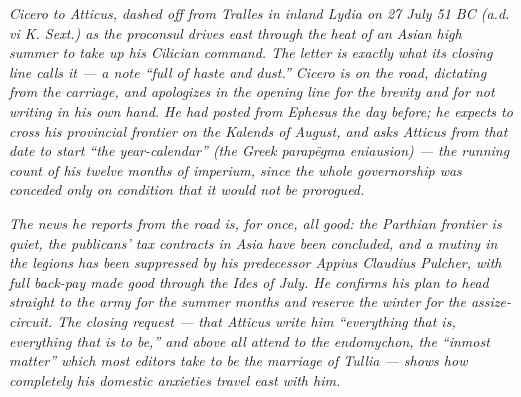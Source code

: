 
\textit{Cicero to Atticus, dashed off from Tralles in inland Lydia
on 27 July 51 BC (a.d. vi K. Sext.) as the proconsul drives east
through the heat of an Asian high summer to take up his Cilician
command. The letter is exactly what its closing line calls it ---
a note ``full of haste and dust.'' Cicero is on the road, dictating
from the carriage, and apologizes in the opening line for the
brevity and for not writing in his own hand. He had posted from
Ephesus the day before; he expects to cross his provincial
frontier on the Kalends of August, and asks Atticus from that
date to start ``the year-calendar'' (the Greek \textit{parap\=egma
eniausion}) --- the running count of his twelve months of
imperium, since the whole governorship was conceded only on
condition that it would not be prorogued.}

\textit{The news he reports from the road is, for once, all good:
the Parthian frontier is quiet, the publicans' tax contracts in
Asia have been concluded, and a mutiny in the legions has been
suppressed by his predecessor Appius Claudius Pulcher, with full
back-pay made good through the Ides of July. He confirms his
plan to head straight to the army for the summer months and
reserve the winter for the assize-circuit. The closing request
--- that Atticus write him ``everything that is, everything that
is to be,'' and above all attend to the \textit{endomychon}, the
``inmost matter'' which most editors take to be the marriage of
Tullia --- shows how completely his domestic anxieties travel
east with him.}
